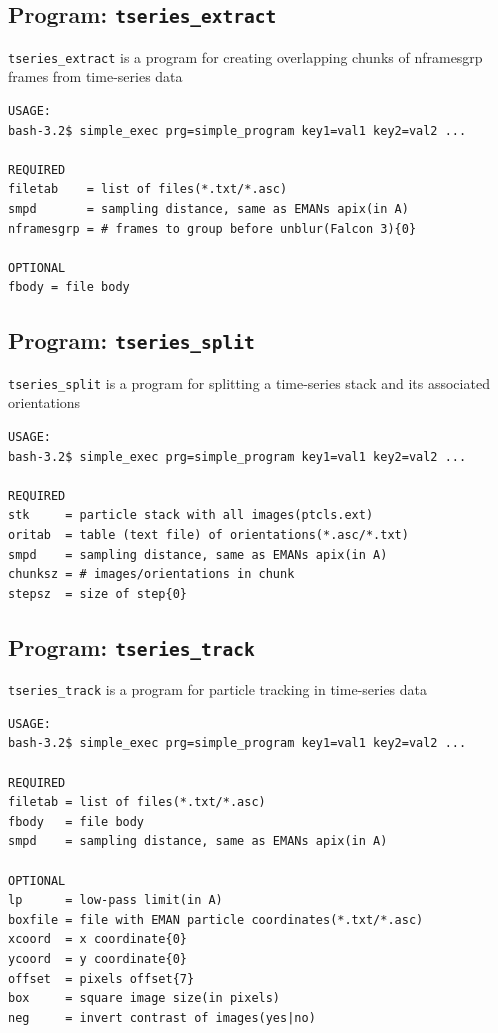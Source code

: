 \documentclass[a4paper,11pt]{article}
\newcommand{\prgname}[1]{\textcolor{NavyBlue}{\texttt{#1}}}
\begin{document}
\subsection{Program: \prgname{tseries\_extract}}
\label{tseries_extract}
\prgname{tseries\_extract} is a program for creating overlapping chunks of nframesgrp frames from time-series data 

\begin{verbatim}
USAGE:
bash-3.2$ simple_exec prg=simple_program key1=val1 key2=val2 ...

REQUIRED
filetab    = list of files(*.txt/*.asc)
smpd       = sampling distance, same as EMANs apix(in A)
nframesgrp = # frames to group before unblur(Falcon 3){0}

OPTIONAL
fbody = file body
\end{verbatim}

\subsection{Program: \prgname{tseries\_split}}
\label{tseries_split}
\prgname{tseries\_split} is a program for splitting a time-series stack and its associated orientations 

\begin{verbatim}
USAGE:
bash-3.2$ simple_exec prg=simple_program key1=val1 key2=val2 ...

REQUIRED
stk     = particle stack with all images(ptcls.ext)
oritab  = table (text file) of orientations(*.asc/*.txt)
smpd    = sampling distance, same as EMANs apix(in A)
chunksz = # images/orientations in chunk
stepsz  = size of step{0}
\end{verbatim}

\subsection{Program: \prgname{tseries\_track}}
\label{tseries_track}
\prgname{tseries\_track} is a program for particle tracking in time-series data 

\begin{verbatim}
USAGE:
bash-3.2$ simple_exec prg=simple_program key1=val1 key2=val2 ...

REQUIRED
filetab = list of files(*.txt/*.asc)
fbody   = file body
smpd    = sampling distance, same as EMANs apix(in A)

OPTIONAL
lp      = low-pass limit(in A)
boxfile = file with EMAN particle coordinates(*.txt/*.asc)
xcoord  = x coordinate{0}
ycoord  = y coordinate{0}
offset  = pixels offset{7}
box     = square image size(in pixels)
neg     = invert contrast of images(yes|no)
\end{verbatim}
\end{document}
